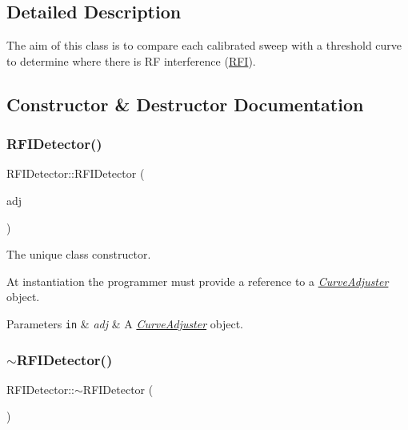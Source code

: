 \subsection{Detailed Description}
The aim of this class is to compare each calibrated sweep with a threshold curve to determine where there is RF interference (\hyperlink{structRFI}{R\+FI}). 

\subsection{Constructor \& Destructor Documentation}
\mbox{\label{classRFIDetector_a1943c00a5ab657a24cdacaf2b0d550f1}} 
\subsubsection{\texorpdfstring{R\+F\+I\+Detector()}{RFIDetector()}}
{\footnotesize\ttfamily R\+F\+I\+Detector\+::\+R\+F\+I\+Detector (\begin{DoxyParamCaption}\item[{\hyperlink{classCurveAdjuster}{Curve\+Adjuster} \&}]{adj }\end{DoxyParamCaption})\hspace{0.3cm}{\ttfamily [inline]}}



The unique class constructor. 

At instantiation the programmer must provide a reference to a {\itshape \hyperlink{classCurveAdjuster}{Curve\+Adjuster}} object. 
\begin{DoxyParams}[1]{Parameters}
\mbox{\tt in}  & {\em adj} & A {\itshape \hyperlink{classCurveAdjuster}{Curve\+Adjuster}} object. \\
\hline
\end{DoxyParams}
\mbox{\label{classRFIDetector_a6445cd27f7b22459d8f1e3b67c323cf0}} 
\subsubsection{\texorpdfstring{$\sim$\+R\+F\+I\+Detector()}{~RFIDetector()}}
{\footnotesize\ttfamily R\+F\+I\+Detector\+::$\sim$\+R\+F\+I\+Detector (\begin{DoxyParamCaption}{ }\end{DoxyParamCaption})\hspace{0.3cm}{\ttfamily [inline]}}



